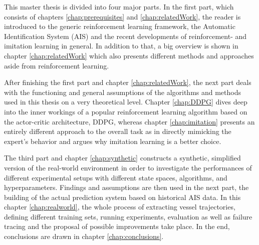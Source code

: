 This master thesis is divided into four major parts. In the first part, which consists of chapters \ref{chap:prerequisites} and \ref{chap:relatedWork}, the reader is introduced to the generic reinforcement learning framework, the Automatic Identification System (AIS) and the recent developments of reinforcement- and imitation learning in general. In addition to that, a big overview is shown in chapter \ref{chap:relatedWork} which also presents different methods and approaches aside from reinforcement learning.
\par
After finishing the first part and chapter \ref{chap:relatedWork}, the next part deals with the functioning and general assumptions of the algorithms and methods used in this thesis on a very theoretical level. Chapter \ref{chap:DDPG} dives deep into the inner workings of a popular reinforcement learning algorithm based on the actor-critic architecture, DDPG, whereas chapter \ref{chap:imitation} presents an entirely different approach to the overall task as in directly mimicking the expert's behavior and argues why imitation learning is a better choice.
\par
The third part and chapter \ref{chap:synthetic} constructs a synthetic, simplified version of the real-world environment in order to investigate the performances of different experimental setups with different state spaces, algorithms, and hyperparameters. Findings and assumptions are then used in the next part, the building of the actual prediction system based on historical AIS data. In this chapter \ref{chap:realworld}, the whole process of extracting vessel trajectories, defining different training sets, running experiments, evaluation as well as failure tracing and the proposal of possible improvements take place. In the end, conclusions are drawn in chapter \ref{chap:conclusions}.
